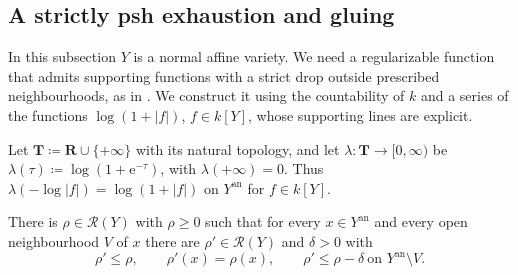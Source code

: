 \documentclass[11pt,a4paper]{article}
\newcommand{\an}{\mathrm{an}}          %
\begin{document}
\subsection{A strictly psh exhaustion and gluing}\label{subsec:gluing}

In this subsection $Y$ is a normal affine variety. We need a regularizable function that admits supporting functions with a strict drop outside prescribed neighbourhoods, as in \cite[Lemmas~6.6 and~6.7]{Wu26}. We construct it using the countability of $k$ and a series of the functions $\log(1+|f|)$, $f\in k[Y]$, whose supporting lines are explicit.

Let $\mathbf T\coloneqq\mathbf R\cup\{+\infty\}$ with its natural topology, and let $\lambda\colon\mathbf T\to[0,\infty)$ be $\lambda(\tau)\coloneqq\log(1+\mathrm e^{-\tau})$, with $\lambda(+\infty)=0$. Thus $\lambda(-\log|f|)=\log(1+|f|)$ on $Y^{\an}$ for $f\in k[Y]$.

\begin{lemma}\label{lem:strict-exhaustion}
There is $\rho\in\mathcal{R}(Y)$ with $\rho\ge0$ such that for every $x\in Y^{\an}$ and every open neighbourhood $V$ of $x$ there are $\rho'\in\mathcal{R}(Y)$ and $\delta>0$ with
\[
\rho'\le\rho,\qquad\rho'(x)=\rho(x),\qquad\rho'\le\rho-\delta\ \text{on }Y^{\an}\setminus V.
\]
\end{lemma}
\end{document}
